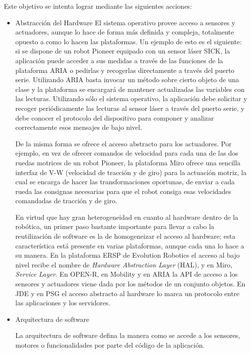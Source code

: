 Este objetivo se intenta lograr mediante las siguientes acciones:

\begin{itemize}
	\itemsep1pt \parskip1pt 
	\item Abstracción del Hardware
	El sistema operativo provee acceso a sensores y actuadores, aunque lo hace de forma más definida y compleja, totalmente opuesto a como lo hacen las plataformas. Un ejemplo de esto es el siguiente: si se dispone de un robot Pioneer equipado con un sensor láser SICK, la aplicación puede acceder a sus medidas a través de las funciones de la plataforma ARIA o pedirlas y recogerlas directamente a través del puerto serie. Utilizando ARIA basta invocar un método sobre cierto objeto de una clase y la plataforma se encargará de mantener actualizadas las variables con las lecturas. Utilizando sólo el sistema operativo, la aplicación debe solicitar y recoger periódicamente las lecturas al sensor láser a través del puerto serie, y debe conocer el protocolo del dispositivo para componer y analizar correctamente esos mensajes de bajo nivel.

	De la misma forma se ofrece el acceso abstracto para los actuadores. Por ejemplo, en vez de ofrecer comandos de velocidad para cada una de las dos ruedas motrices de un robot Pioneer, la plataforma Miro ofrece una sencilla interfaz de V-W (velocidad de tracción y de giro) para la actuación motriz, la cual se encarga de hacer las transformaciones oportunas, de enviar a cada rueda las consignas necesarias para que el robot consiga esas velocidades comandadas de tracción y de giro.

	En virtud que hay gran heterogeneidad en cuanto al hardware dentro de la robótica, un primer paso bastante importante para llevar a cabo la reutilización de software es la de homogeneizar el acceso al hardware; esta característica está presente en varias plataformas, aunque cada una lo hace a su manera. En la plataforma ERSP de Evolution Robotics el acceso al bajo nivel recibe el nombre de \textit{Hardware Abstraction Layer} (HAL), y en Miro, \textit{Service Layer}. En OPEN-R, en Mobility y en ARIA la API de acceso a los sensores y actuadores viene dada por los métodos de un conjunto objetos. En JDE y en PSG el acceso abstracto al hardware lo marca un protocolo entre las aplicaciones y los servidores.

	\item Arquitectura de software

	La arquitectura de software defina la manera como se accede a los sensores, motores o funcionalidades por parte del código de la aplicación.


\end{itemize}
